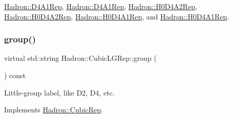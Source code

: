 \mbox{\hyperlink{structHadron_1_1D4A1Rep_a4224f0d47cc0a894a9da4c8505d51c29}{Hadron\+::\+D4\+A1\+Rep}}, \mbox{\hyperlink{structHadron_1_1D4A1Rep_a4224f0d47cc0a894a9da4c8505d51c29}{Hadron\+::\+D4\+A1\+Rep}}, \mbox{\hyperlink{structHadron_1_1H0D4A2Rep_a637522dc6caee2869b2bb632a4c5a5b5}{Hadron\+::\+H0\+D4\+A2\+Rep}}, \mbox{\hyperlink{structHadron_1_1H0D4A2Rep_a637522dc6caee2869b2bb632a4c5a5b5}{Hadron\+::\+H0\+D4\+A2\+Rep}}, \mbox{\hyperlink{structHadron_1_1H0D4A1Rep_ab13ff026da1bc59df4b52835038296d5}{Hadron\+::\+H0\+D4\+A1\+Rep}}, and \mbox{\hyperlink{structHadron_1_1H0D4A1Rep_ab13ff026da1bc59df4b52835038296d5}{Hadron\+::\+H0\+D4\+A1\+Rep}}.

\mbox{\label{structHadron_1_1CubicLGRep_a9bdb14b519a611d21379ed96a3a9eb41}} 
\subsubsection{\texorpdfstring{group()}{group()}\hspace{0.1cm}{\footnotesize\ttfamily [1/2]}}
{\footnotesize\ttfamily virtual std\+::string Hadron\+::\+Cubic\+L\+G\+Rep\+::group (\begin{DoxyParamCaption}{ }\end{DoxyParamCaption}) const\hspace{0.3cm}{\ttfamily [pure virtual]}}

Little-\/group label, like D2, D4, etc. 

Implements \mbox{\hyperlink{structHadron_1_1CubicRep_a0748f11ec87f387062c8e8981339a29c}{Hadron\+::\+Cubic\+Rep}}.



